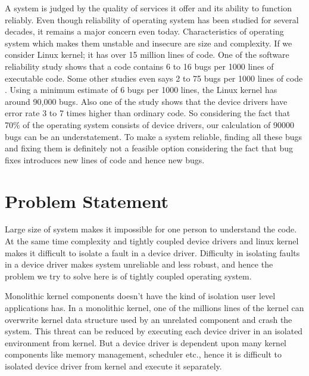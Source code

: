 
A system is judged by the quality of services it offer and its ability to function reliably. Even though reliability of operating system has been studied for several decades, it remains a major concern even today. Characteristics of operating system which makes them unstable and insecure are size and complexity. If we consider Linux kernel; it has over 15 million lines of code. One of the software reliability study shows that a code contains 6 to 16 bugs per 1000 lines of executable code\cite{Basili:1984:SEC:69605.2085}\cite{Tanenbaum06canwe}. Some other studies even says 2 to 75 bugs per 1000 lines of code \cite{Ostrand:2002:DFL:566172.566181}. Using a minimum estimate of 6 bugs per 1000 lines, the Linux kernel has around 90,000 bugs. Also one of the study shows that the device drivers have error rate 3 to 7 times higher than ordinary code\cite{Chou:2001:ESO:502034.502042}. So considering the fact that 70\% of the operating system consists of device drivers, our calculation of 90000 bugs can be an understatement\cite{Chou:2001:ESO:502034.502042}. To make a system reliable, finding all these bugs and fixing them is definitely not a feasible option considering the fact that bug fixes introduces new lines of code and hence new bugs.

\pagebreak

\section {Problem Statement}

Large size of system makes it impossible for one person to understand the code. At the same time complexity and tightly coupled device drivers and linux kernel makes it difficult to isolate a fault in a device driver. Difficulty in isolating faults in a device driver makes system unreliable and less robust, and hence the problem we try to solve here is of tightly coupled operating system. 

Monolithic kernel components doesn’t have the kind of isolation user level applications has. In a monolithic kernel, one of the millions lines of the kernel can overwrite kernel data structure used by an unrelated component and crash the system. This threat can be reduced by executing each device driver in an isolated environment from kernel. But a device driver is dependent upon many kernel components like memory management, scheduler etc., hence it is difficult to isolated device driver from kernel and execute it separately.

